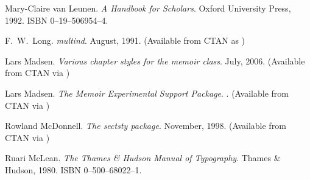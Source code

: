 \begin{thebibliography}{GMS94A}
  Mary-Claire van Leunen.
  \newblock \emph{A Handbook for Scholars}.
  \newblock Oxford University Press, 1992.
  \newblock ISBN 0--19--506954--4.

\begin{comment}
\bibitem[Liv02]{LIVIO02}
  Mario Livio.
  \newblock \emph{The Golden Ratio: The Story of Phi, the World's Most
     Astonishing Number}.
  \newblock Broadway Books, 2002.
  \newblock ISBN 0--7679--0816--3.
\end{comment}

  F.~W.~Long.
  \newblock \emph{multind}.
  \newblock August, 1991.
  \newblock (Available from CTAN as
  ) 

  Lars Madsen.
  \newblock \emph{Various chapter styles for the memoir class}.
  \newblock July, 2006.
  \newblock (Available from CTAN via
  ) 

  Lars Madsen.
  \newblock \emph{The Memoir Experimental Support Package}.
  .
  \newblock (Available from CTAN via
  ) 

  Rowland McDonnell.
  \newblock \emph{The sectsty package}.
  \newblock November, 1998.
  \newblock (Available from CTAN via
             )

\begin{comment}
\bibitem[McL75]{MCLEAN75}
  Ruari McLean.
  \newblock \emph{Jan Tschichold: Typographer}.
  \newblock David R.~Godine, 1975.
  \newblock ISBN 0--87923--841--0.
\end{comment}

  Ruari McLean.
  \newblock \emph{The Thames \& Hudson Manual of Typography}.
  \newblock Thames \& Hudson, 1980.
  \newblock ISBN 0--500--68022--1.

\begin{comment}
\bibitem[McL95]{MCLEAN95}
  Ruari McLean (Ed).
  \newblock \emph{Typographers on Type}.
  \newblock W.~W.~Norton \& Co., 1995.
  \newblock ISBN 0--393--70201--4.

\bibitem[MMc95]{MEGGS00}
  Philip B.~Meggs and Roy McKelvey (Eds).
  \newblock \emph{Revival of the Fittest: Digital Versions of the Classic Typefaces}.
  \newblock RC Publications, Inc., 2000.
  \newblock ISBN 1--883915--08--2.


\end{comment}
\end{thebibliography}
